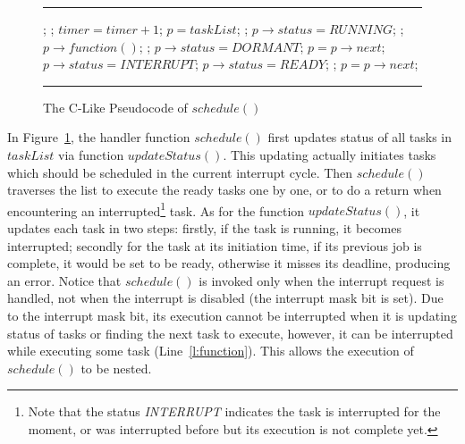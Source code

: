 \documentclass[10pt,journal]{IEEEtran}
\begin{document}
\begin{figure}[!t]
\hrule\vspace{1mm}
  \begin{algorithmic}[1]
  \State {};  \label{l:1stline}
  \State {}; \label{l:updatestatus}
  \State $timer = timer + 1$; \label{l:timer} \label{l:inc}
  \State $p = taskList$;
   \label{l:startrun1st}
      \State \Return; \label{l:return}
      \State $p\rightarrow status = \textit{RUNNING}$;
      \State {};  \label{l:endrun1st}
      \State $p\rightarrow function()$;  \label{l:function}
      \State {};
      \State $p\rightarrow status = \textit{DORMANT}$;
    \EndIf
    \State $p = p\rightarrow next$;
  \EndWhile
\EndFunction
{}
     \label{l:startupdate}
      \State $p\rightarrow status = \textit{INTERRUPT}$;
    \EndIf
     
        
        \State $p\rightarrow status = \textit{READY}$;
      \Else {}
	\State {}; 
      \EndIf
    \EndIf \label{l:endupdate}
    \State $p = p\rightarrow next$;
  \EndWhile
\EndFunction
  \end{algorithmic}
\hrule
  \caption{The C-Like Pseudocode of $schedule()$}
  \label{a:schedule}
\end{figure}

In Figure~\ref{a:schedule}, the handler function $schedule()$ first
updates status of all tasks in $taskList$ via function
$updateStatus()$. This updating actually initiates tasks which should
be scheduled in the current interrupt cycle. Then $schedule()$
traverses the list to execute the ready tasks one by one, or to do a
return when encountering an interrupted\footnote{Note that the status
  \textit{INTERRUPT} indicates the task is interrupted for the moment,
  or was interrupted before but its execution is not complete yet.}
task. As for the function $updateStatus()$, it updates each task in
two steps: firstly, if the task is running, it becomes interrupted;
secondly for the task at its initiation time, if its previous job is
complete, it would be set to be ready, otherwise it misses its
deadline, producing an error. Notice that $schedule()$ is invoked only
when the interrupt request is handled, not when the interrupt is
disabled (the interrupt mask bit is set). Due to the interrupt
mask bit, its execution cannot be interrupted when it is updating
status of tasks or finding the next task to execute, however, it can
be interrupted while executing some task (Line~\ref{l:function}). This
allows the execution of $schedule()$ to be nested.
\end{document}
